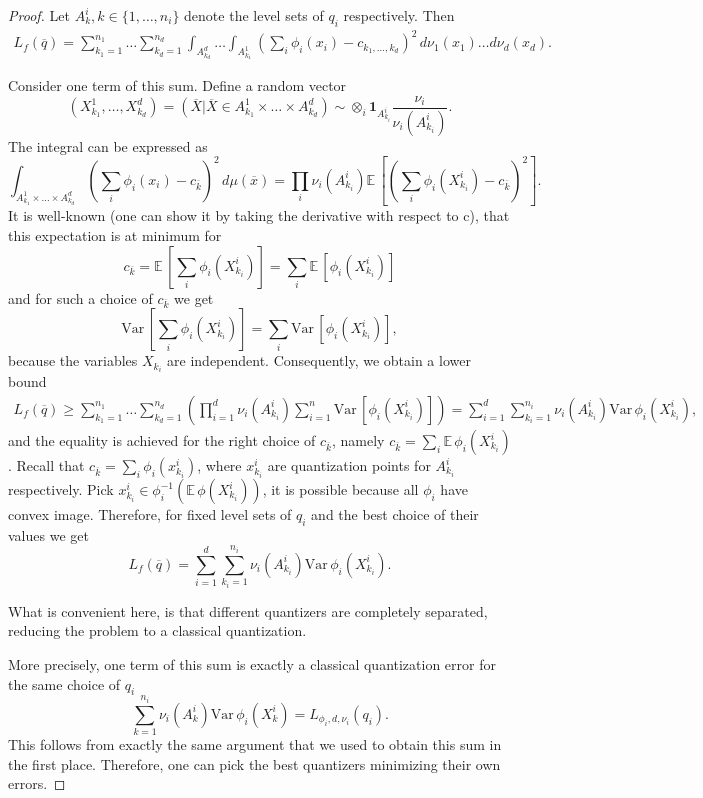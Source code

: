 \documentclass{amsart}
\theoremstyle{remark}
\numberwithin{equation}{section}
\numberwithin{figure}{section}
\def\E{\mathbb{E}\,}
\def\Var{\mathrm{Var}\,}
\def\1{\mathbf{1}}
\def\v{\overline}
\begin{document}
\begin{proof}
	Let $A_k^i, k\in \{1, \ldots, n_i\}$ denote the level sets of $q_i$ respectively. Then
	\begin{align*}
		L_f (\v q)= \sum_{k_1 = 1}^{n_1} \ldots \sum_{k_d = 1}^{n_d} \int_{A_{k_d}^d}\ldots \int_{A_{k_1}^1} \left(\sum_i \phi_i(x_i)-c_{k_1, \ldots, k_d}\right)^2\, d \nu_1(x_1) \ldots d \nu_d(x_d).
	\end{align*}
	
	Consider one term of this sum.
	Define a random vector
	\[
	(X_{k_1}^1, \ldots, X_{k_d}^d) = (\v X | \v X \in A_{k_1}^1 \times \ldots \times A_{k_d}^d) \sim \otimes_i \1_{A_{k_i}^i}\frac{\nu_i}{\nu_i(A_{k_i}^i)}.
	\]
	The integral can be expressed as
	\[
	\int_{A_{k_1}^1\times \ldots \times A_{k_d}^d}\left(\sum_i \phi_i(x_i)-c_{\v k}\right)^2\, d \mu(\v x)  = \prod_i \nu_i(A_{k_i}^i)\E \left[\left(\sum_i \phi_i(X_{k_i}^i)-c_{\v k}\right)^2\right].
	\]
	It is well-known (one can show it by taking the derivative with respect to c), that this expectation is at minimum for 
	\[
	c_{\v k} = \E \left[\sum_i \phi_i(X_{k_i}^i)\right] = \sum_i \E [\phi_i(X_{k_i}^i)]
	\]
	and for such a choice of $c_{\v k}$ we get
	\[
	\Var \left[\sum_i \phi_i(X_{k_i}^i)\right] = \sum_i \Var \left[\phi_i(X_{k_i}^i)\right],
	\] 
	because the variables $X_{k_i}$ are independent. Consequently, we obtain a lower bound
	\begin{align*}
	L_f (\v q) \geq  \sum_{k_1=1}^{n_1}\ldots \sum_{k_d=1}^{n_d} \left(\prod_{i=1}^{d} \nu_i(A_{k_i}^i)\sum_{i=1}^n \Var [\phi_i(X_{k_i}^i)]\right)
	= \sum_{i=1}^d \sum_{k_i=1}^{n_i}\nu_i(A_{k_i}^i)\Var \phi_i(X_{k_i}^i),
		\end{align*}
	and the equality is achieved for the right choice of $c_{\v k}$, namely $c_{\v k} = \sum_i \E \phi_i(X_{k_i}^i)$. Recall that $c_{\v k} = \sum_i \phi_i(x_{k_i}^i)$, where $x_{k_i}^i$ are quantization points for $A_{k_i}^i$ respectively. Pick $x_{k_i}^i \in \phi_i^{-1}(\E \phi(X_{k_i}^i))$, it is possible because all $\phi_i$ have convex image. Therefore, for fixed level sets of $q_i$ and the best choice of their values we get
	\[
	L_f(\v q) = \sum_{i=1}^d \sum_{k_i=1}^{n_i}\nu_i(A_{k_i}^i)\Var \phi_i(X_{k_i}^i).
	\]
	
	 What is convenient here, is that different quantizers are completely separated, reducing the problem to a classical quantization.
	
	More precisely, one term of this sum is exactly a classical quantization error for the same choice of $q_i$
	\[
	\sum_{k = 1}^{n_i} \nu_i(A_k^i) \Var \phi_i (X_k^i) = L_{\phi_i, d, \nu_i}(q_i).
	\]
	This follows from exactly the same argument that we used to obtain this sum in the first place. Therefore, one can pick the best quantizers minimizing their own errors.
\end{proof}	
\end{document}
